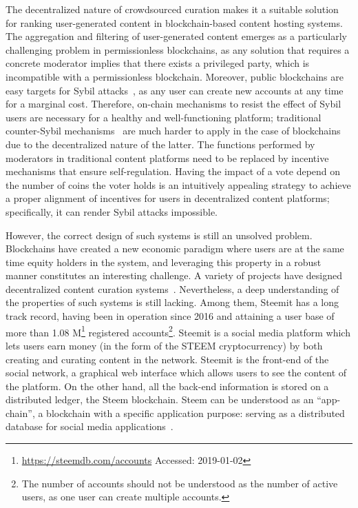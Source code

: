 \documentclass[a4paper,english,cleveref, autoref]{oasics-v2019}
\begin{document}
  The decentralized nature of crowdsourced curation makes it a suitable solution
  for ranking user-generated content in blockchain-based content hosting
  systems. The aggregation and filtering of user-generated content emerges as a
  particularly challenging problem in permissionless blockchains, as any
  solution that requires a concrete moderator implies that there exists a
  privileged party, which is incompatible with a permissionless blockchain.
  Moreover, public blockchains are easy targets for Sybil
  attacks~\cite{sybilattack}, as any user can create new accounts at any time
  for a marginal cost. Therefore, on-chain mechanisms to resist the effect of
  Sybil users are necessary for a healthy and well-functioning platform;
  traditional counter-Sybil mechanisms~\cite{levine2006survey} are much harder
  to apply in the case of blockchains due to the decentralized nature of the
  latter. The functions performed by moderators in traditional content platforms
  need to be replaced by incentive mechanisms that ensure self-regulation.
  Having the impact of a vote depend on the number of coins the voter holds is
  an intuitively appealing strategy to achieve a proper alignment of incentives
  for users in decentralized content platforms; specifically, it can render
  Sybil attacks impossible.

  However, the correct design of such systems is still an unsolved problem.
  Blockchains have created a new economic paradigm where users are at the same
  time equity holders in the system, and leveraging this property in a robust
  manner constitutes an interesting challenge. A variety of projects have
  designed decentralized content curation systems~\cite{synereo,steemit,tcr}.
  Nevertheless, a deep understanding of the properties of such systems is still
  lacking. Among them, Steemit has a long track record, having been in operation
  since 2016 and attaining a user base of more than 1.08
  M\footnote{\url{https://steemdb.com/accounts} Accessed: 2019-01-02} registered
  accounts\footnote{The number of accounts should not be understood as the
  number of active users, as one user can create multiple accounts.}. Steemit is
  a social media platform which lets users earn money (in the form of the STEEM
  cryptocurrency) by both creating and curating content in the network. Steemit
  is the front-end of the social network, a graphical web interface which allows
  users to see the content of the platform. On the other hand, all the back-end
  information is stored on a distributed ledger, the Steem blockchain. Steem can
  be understood as an ``app-chain'', a blockchain with a specific application
  purpose: serving as a distributed database for social media
  applications~\cite{steemit}.
\end{document}
